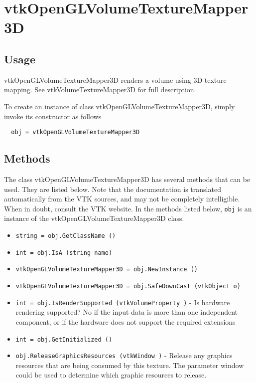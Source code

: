 \section{vtkOpenGLVolumeTextureMapper3D}

\subsection{Usage}

 vtkOpenGLVolumeTextureMapper3D renders a volume using 3D texture mapping.
 See vtkVolumeTextureMapper3D for full description.

To create an instance of class vtkOpenGLVolumeTextureMapper3D, simply
invoke its constructor as follows
\begin{verbatim}
  obj = vtkOpenGLVolumeTextureMapper3D
\end{verbatim}
\subsection{Methods}

The class vtkOpenGLVolumeTextureMapper3D has several methods that can be used.
  They are listed below.
Note that the documentation is translated automatically from the VTK sources,
and may not be completely intelligible.  When in doubt, consult the VTK website.
In the methods listed below, \verb|obj| is an instance of the vtkOpenGLVolumeTextureMapper3D class.
\begin{itemize}
\item  \verb|string = obj.GetClassName ()|

\item  \verb|int = obj.IsA (string name)|

\item  \verb|vtkOpenGLVolumeTextureMapper3D = obj.NewInstance ()|

\item  \verb|vtkOpenGLVolumeTextureMapper3D = obj.SafeDownCast (vtkObject o)|

\item  \verb|int = obj.IsRenderSupported (vtkVolumeProperty )| -  Is hardware rendering supported? No if the input data is
 more than one independent component, or if the hardware does
 not support the required extensions

\item  \verb|int = obj.GetInitialized ()|

\item  \verb|obj.ReleaseGraphicsResources (vtkWindow )| -  Release any graphics resources that are being consumed by this texture.
 The parameter window could be used to determine which graphic
 resources to release.

\end{itemize}
